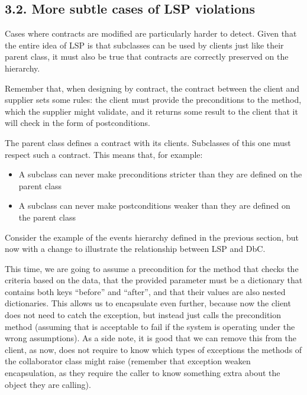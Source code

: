 \documentclass[a4paper,10pt,english]{sphinxmanual}
\begin{document}
\subsection{3.2. More subtle cases of LSP violations}
\label{\detokenize{chapters/4_solid_principles/index:more-subtle-cases-of-lsp-violations}}
Cases where contracts are modified are particularly harder to detect. Given
that the entire idea of LSP is that subclasses can be used by clients just like their parent
class, it must also be true that contracts are correctly preserved on the hierarchy.

Remember that, when designing by contract,
the contract between the client and supplier sets some rules: the client must provide the
preconditions to the method, which the supplier might validate, and it returns some result
to the client that it will check in the form of postconditions.

The parent class defines a contract with its clients. Subclasses of this one must respect such
a contract. This means that, for example:
\begin{itemize}
\item {} 
A subclass can never make preconditions stricter than they are defined on the parent class

\item {} 
A subclass can never make postconditions weaker than they are defined on the parent class

\end{itemize}

Consider the example of the events hierarchy defined in the previous section, but now with
a change to illustrate the relationship between LSP and DbC.

This time, we are going to assume a precondition for the method that checks the criteria
based on the data, that the provided parameter must be a dictionary that contains both keys
“before” and “after”, and that their values are also nested dictionaries. This allows us to
encapsulate even further, because now the client does not need to catch the 
exception, but instead just calls the precondition method (assuming that is acceptable to fail
if the system is operating under the wrong assumptions). As a side note, it is good that we
can remove this from the client, as now,  does not require to know which
types of exceptions the methods of the collaborator class might raise (remember that
exception weaken encapsulation, as they require the caller to know something extra about
the object they are calling).
\end{document}

